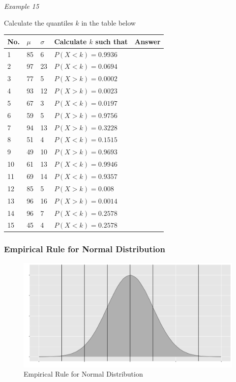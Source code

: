 \documentclass[]{book}
\begin{document}
\emph{Example 15}

Calculate the quantiles \(k\) in the table below

\begin{longtable}[]{@{}lllll@{}}
\toprule
No. & \(\mu\) & \(\sigma\) & Calculate \(k\) such that & Answer\tabularnewline
\midrule
\endhead
1 & 85 & 6 & \(P( X <k)= 0.9936\) &\tabularnewline
2 & 97 & 23 & \(P( X <k)= 0.0694\) &\tabularnewline
3 & 77 & 5 & \(P( X >k)= 0.0002\) &\tabularnewline
4 & 93 & 12 & \(P( X >k)= 0.0023\) &\tabularnewline
5 & 67 & 3 & \(P( X <k)= 0.0197\) &\tabularnewline
6 & 59 & 5 & \(P( X >k)= 0.9756\) &\tabularnewline
7 & 94 & 13 & \(P( X >k)= 0.3228\) &\tabularnewline
8 & 51 & 4 & \(P( X <k)= 0.1515\) &\tabularnewline
9 & 49 & 10 & \(P( X >k)= 0.9693\) &\tabularnewline
10 & 61 & 13 & \(P( X <k)= 0.9946\) &\tabularnewline
11 & 69 & 14 & \(P( X <k)= 0.9357\) &\tabularnewline
12 & 85 & 5 & \(P( X>k)= 0.008\) &\tabularnewline
13 & 96 & 16 & \(P( X >k)= 0.0014\) &\tabularnewline
14 & 96 & 7 & \(P( X <k)= 0.2578\) &\tabularnewline
15 & 45 & 4 & \(P( X <k)= 0.2578\) &\tabularnewline
\bottomrule
\end{longtable}

\hypertarget{empirical-rule-for-normal-distribution}{%
\subsubsection{Empirical Rule for Normal Distribution}\label{empirical-rule-for-normal-distribution}}

\begin{figure}

{\centering \includegraphics{figure/norm4-1} 

}

\caption{Empirical Rule for Normal Distribution}\label{fig:norm4}
\end{figure}
\end{document}
